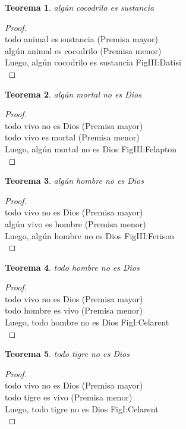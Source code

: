 ﻿\documentclass[12pt]{book}
\newtheorem{theorem}{Teorema}[chapter]
\newtheorem{proof}{Demostración}
\begin{document}
\begin{theorem}
algún cocodrilo es sustancia
\label{th: 86}
\end{theorem}\begin{proof}\\todo animal es sustancia	 (Premisa mayor) \\algún animal es cocodrilo	 (Premisa menor) \\Luego, algún cocodrilo es sustancia	FigIII:Datisi \\ \end{proof}
\begin{theorem}
algún mortal no es Dios
\label{th: 87}
\end{theorem}\begin{proof}\\todo vivo no es Dios	 (Premisa mayor) \\todo vivo es mortal	 (Premisa menor) \\Luego, algún mortal no es Dios	FigIII:Felapton \\ \end{proof}
\begin{theorem}
algún hombre no es Dios
\label{th: 88}
\end{theorem}\begin{proof}\\todo vivo no es Dios	 (Premisa mayor) \\algún vivo es hombre	 (Premisa menor) \\Luego, algún hombre no es Dios	FigIII:Ferison \\ \end{proof}
\begin{theorem}
todo hombre no es Dios
\label{th: 89}
\end{theorem}\begin{proof}\\todo vivo no es Dios	 (Premisa mayor) \\todo hombre es vivo	 (Premisa menor) \\Luego, todo hombre no es Dios	FigI:Celarent \\ \end{proof}
\begin{theorem}
todo tigre no es Dios
\label{th: 90}
\end{theorem}\begin{proof}\\todo vivo no es Dios	 (Premisa mayor) \\todo tigre es vivo	 (Premisa menor) \\Luego, todo tigre no es Dios	FigI:Celarent \\ \end{proof}
\end{document}
